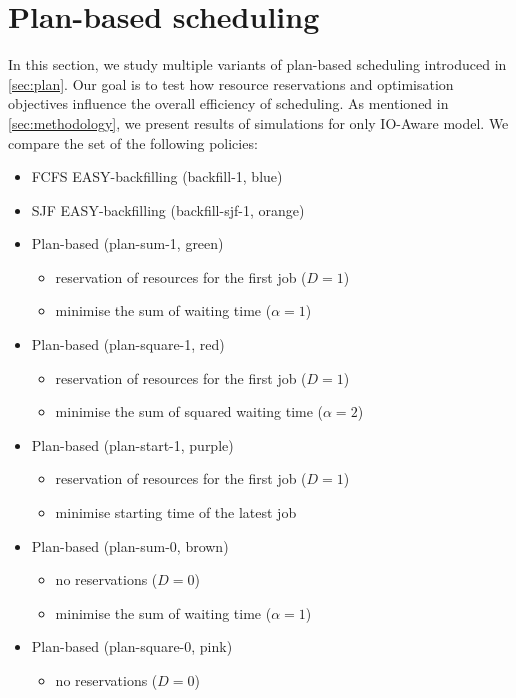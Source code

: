 \documentclass[thesis-en.tex]{subfiles}
\begin{document}
\section{Plan-based scheduling} \label{sec:plan-results}
In this section, we study multiple variants of plan-based scheduling introduced in \autoref{sec:plan}. Our goal is to test how resource reservations and optimisation objectives influence the overall efficiency of scheduling. As mentioned in \autoref{sec:methodology}, we present results of simulations for only IO-Aware model. We compare the set of the following policies:
\begin{itemize}
    \item FCFS EASY-backfilling (backfill-1, blue)
    \item SJF EASY-backfilling (backfill-sjf-1, orange)
    \item Plan-based (plan-sum-1, green)
    \begin{itemize}
        \item reservation of resources for the first job ($D=1$)
        \item minimise the sum of waiting time ($\alpha=1$)
    \end{itemize}
    \item Plan-based (plan-square-1, red)
    \begin{itemize}
        \item reservation of resources for the first job ($D=1$)
        \item minimise the sum of squared waiting time ($\alpha=2$)
    \end{itemize}
    \item Plan-based (plan-start-1, purple)
    \begin{itemize}
        \item reservation of resources for the first job ($D=1$)
        \item minimise starting time of the latest job
    \end{itemize}
    \item Plan-based (plan-sum-0, brown)
    \begin{itemize}
        \item no reservations ($D=0$)
        \item minimise the sum of waiting time ($\alpha=1$)
    \end{itemize}
    \item Plan-based (plan-square-0, pink)
    \begin{itemize}
        \item no reservations ($D=0$)

\end{itemize}
\end{itemize}
\end{document}
